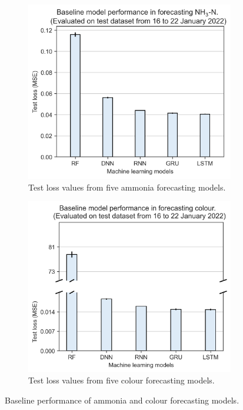 \begin{figure}[h]
    \centering
    \begin{subfigure}[t]{0.45\textwidth}
      \includegraphics[width=\linewidth]{imgs/results/baseline-models-nh3.png}
      \caption{Test loss values from five ammonia forecasting models.} \label{fig:baseline-nh3}
    \end{subfigure}%
    \hspace{2em}%
    \begin{subfigure}[t]{0.45\textwidth}
      \includegraphics[width=\linewidth]{imgs/results/baseline-models-colour.png}
      \caption{Test loss values from five colour forecasting models.} \label{fig:baseline-colour}
    \end{subfigure}%
  \caption{Baseline performance of ammonia and colour forecasting models.} \label{fig:baseline-performance}
\end{figure}

